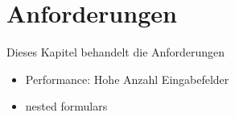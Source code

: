 \section{Anforderungen}

Dieses Kapitel behandelt die Anforderungen

\begin{itemize}
    \item Performance: Hohe Anzahl Eingabefelder
    \item nested formulars
\end{itemize}
